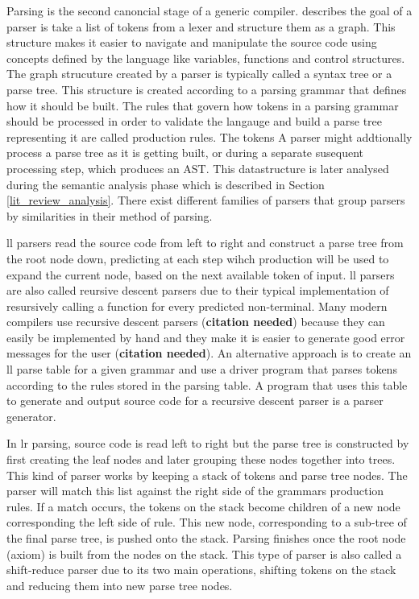 \cite{mark_thierry_vandevoorde_parallel_1988, alblas_bibliography_1994}

Parsing is the second canoncial stage of a generic compiler.
\cite{scott_programming_2015} describes the goal of a parser is take a list
of tokens from a lexer and structure them as a graph. This structure makes it
easier to navigate and manipulate the source code using concepts defined by the
language like variables, functions and control structures. The graph strucuture
created by a parser is typically called a syntax tree or a parse tree. This
structure is created according to a parsing grammar that defines how it should
be built. The rules that govern how tokens in a parsing grammar should be
processed in order to validate the langauge and build a parse tree representing
it are called production rules. The tokens A parser might addtionally process
a parse tree as it is getting built, or during a separate susequent processing
step, which produces an AST. This datastructure is later analysed during the
semantic analysis phase which is described in Section \ref{lit_review_analysis}.
There exist different families of parsers that group parsers by similarities in
their method of parsing.

\gls{ll} parsers read the source code from left to right and construct a
parse tree from the root node down, predicting at each step wihch production
will be used to expand the current node, based on the next available token
of input. \gls{ll} parsers are also called reursive descent parsers due to
their typical implementation of resursively calling a function for every
predicted non-terminal. Many modern compilers use recursive descent parsers
(\textbf{citation needed}) because they can easily be implemented by hand and they
make it is easier to generate good error messages for the user (\textbf{citation
needed}). An alternative approach is to create an \gls{ll} parse table for a
given grammar and use a driver program that  parses tokens according to the
rules stored in the parsing table. A program that uses this table to generate
and output source code for a recursive descent parser is a parser generator.

In \gls{lr} parsing, source code is read left to right but the parse tree is
constructed by first creating the leaf nodes and later grouping these nodes
together into trees. This kind of parser works by keeping a stack of tokens and
parse tree nodes. The parser will match this list against the right side of the
grammars production rules. If a match occurs, the tokens on the stack become
children of a new node corresponding the left side of rule. This new node,
corresponding to a sub-tree of the final parse tree, is pushed onto the stack.
Parsing finishes once the root node (axiom) is built from the nodes on the
stack. This type of parser is also called a shift-reduce parser due to its two
main operations, shifting tokens on the stack and reducing them into new parse
tree nodes. 

